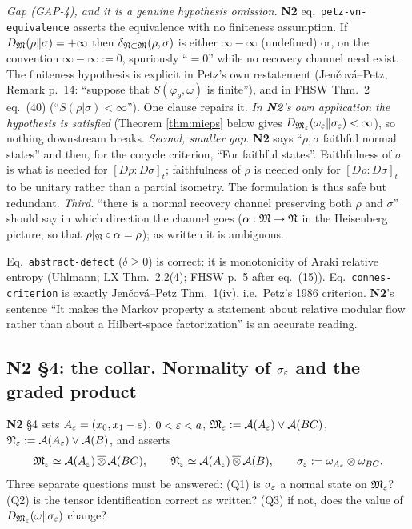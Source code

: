 \documentclass[11pt]{article}
\newcommand{\NII}{\textbf{N2}}
\newcommand{\loc}[1]{{\small\texttt{#1}}}
\newcommand{\1}{\mathbf 1}
\begin{document}
\begin{verdictgap}
\emph{Gap (GAP-4), and it is a genuine hypothesis omission.} \NII{} eq.~\loc{petz-vn-equivalence}
asserts the equivalence with no finiteness assumption. If $D_{\mathfrak M}(\rho\|\sigma)=+\infty$ then
$\delta_{\mathfrak N\subset\mathfrak M}(\rho,\sigma)$ is either $\infty-\infty$ (undefined) or, on the convention
$\infty-\infty:=0$, spuriously ``$=0$'' while no recovery channel need exist. The finiteness
hypothesis is explicit in Petz's own restatement (Jen\v{c}ov\'a--Petz, Remark p.~14: ``suppose that
$S(\varphi_\theta,\omega)$ is finite''), and in FHSW Thm.~2 eq.~(40) (``$S(\rho|\sigma)<\infty$'').
One clause repairs it. \emph{In \NII's own application the hypothesis \emph{is} satisfied}
(Theorem \ref{thm:mieps} below gives $D_{\mathfrak M_\varepsilon}(\omega_\varepsilon\|\sigma_\varepsilon)<\infty$), so nothing
downstream breaks.
\emph{Second, smaller gap.} \NII{} says ``$\rho,\sigma$ faithful normal states'' and then, for the
cocycle criterion, ``For faithful states''. Faithfulness of $\sigma$ is what is needed for
$[D\rho:D\sigma]_t$; faithfulness of $\rho$ is needed only for $[D\rho:D\sigma]_t$ to be unitary rather
than a partial isometry. The formulation is thus safe but redundant.
\emph{Third.} ``there is a normal recovery channel preserving both $\rho$ and $\sigma$'' should say in
which direction the channel goes ($\alpha:\mathfrak M\to\mathfrak N$ in the Heisenberg picture, so that
$\rho|_{\mathfrak N}\circ\alpha=\rho$); as written it is ambiguous.
\end{verdictgap}
\begin{verdictok}
Eq.~\loc{abstract-defect} ($\delta\ge0$) is correct: it is monotonicity of Araki relative entropy
(Uhlmann; LX Thm.~2.2(4); FHSW p.~5 after eq.~(15)). Eq.~\loc{connes-criterion} is exactly
Jen\v{c}ov\'a--Petz Thm.~1(iv), i.e.\ Petz's 1986 criterion. \NII's sentence ``It makes the Markov
property a statement about relative modular flow rather than about a Hilbert-space factorization''
is an accurate reading.
\end{verdictok}

\subsection{N2 \S4: the collar. Normality of \texorpdfstring{$\sigma_\varepsilon$}{sigma-eps} and the graded product}\label{sec:graded}

\NII{} \S4 sets $A_\varepsilon=(x_0,x_1-\varepsilon)$, $0<\varepsilon<a$,
$\mathfrak M_\varepsilon:=\mathcal A(A_\varepsilon)\vee\mathcal A(BC)$, $\mathfrak N_\varepsilon:=\mathcal A(A_\varepsilon)\vee\mathcal A(B)$, and asserts
\begin{equation}\label{n2:split}
 \mathfrak M_\varepsilon\simeq\mathcal A(A_\varepsilon)\,\overline\otimes\,\mathcal A(BC),\qquad
 \mathfrak N_\varepsilon\simeq\mathcal A(A_\varepsilon)\,\overline\otimes\,\mathcal A(B),\qquad
 \sigma_\varepsilon:=\omega_{A_\varepsilon}\otimes\omega_{BC}.
\end{equation}
Three separate questions must be answered: (Q1) is $\sigma_\varepsilon$ a normal state on $\mathfrak M_\varepsilon$?
(Q2) is the tensor identification correct as written? (Q3) if not, does the value of
$D_{\mathfrak M_\varepsilon}(\omega\|\sigma_\varepsilon)$ change?
\end{document}
